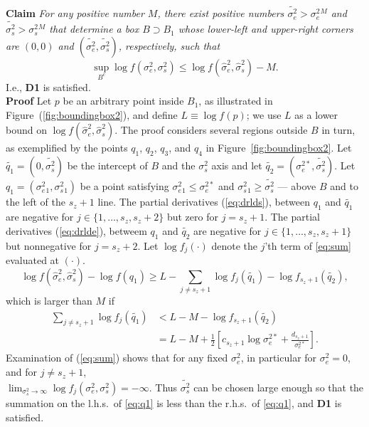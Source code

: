 \documentclass{report}
\newcommand{\RL}{f}
\newcommand{\logRL}{\log\RL}
\newcommand{\sigssq}{\sigma_s^2}
\newcommand{\sigesq}{\sigma_e^2}
\newcommand{\sshat}{\hat\sigma^2_e,\hat\sigma^2_s}
\newcommand{\logRLss}{\logRL(\sigesq,\sigssq)}
\begin{document}
\noindent\textbf{Claim} \emph{For any positive number $M$, there exist positive numbers $\widetilde{\sigma_e^2} > \sigesq{}^M$ and $\widetilde{\sigma_s^2} > \sigssq{}^M$ that determine a box $B \supset B_1$ whose lower-left and upper-right corners are $(0,0)$ and $(\widetilde{\sigma_e^2}, \widetilde{\sigma_s^2})$, respectively, such that
\begin{equation*}
  \sup_{B^c} \logRLss \le \logRL(\sshat) - M.
\end{equation*}}
I.e., \textbf{D1} is satisfied.\\
\noindent\textbf{Proof}
Let $p$ be an arbitrary point inside $B_1$, as illustrated in Figure~(\ref{fig:boundingbox2}), and define $L \equiv \logRL(p)$; we use $L$ as a lower bound on $\logRL(\sshat)$.  The proof considers several regions outside $B$ in turn, as exemplified by the points $q_1$, $q_2$, $q_3$, and $q_4$ in Figure~\ref{fig:boundingbox2}.  Let $\widetilde{q_1} = (0,\widetilde{\sigma_s^2})$ be the intercept of $B$ and the $\sigssq$ axis and let $\widetilde{q_2} = (\sigma_e^{2*},\widetilde{\sigma_s^2})$.  Let $q_1 = (\sigesq{}_1, \sigssq{}_1)$ be a point satisfying $\sigesq{}_1 \le \sigma_e^{2*}$ and $\sigssq{}_1 \ge \widetilde{\sigma_s^2}$ --- above $B$ and to the left of the $s_z+1$ line.  The partial derivatives (\ref{eq:drlds}), between $q_1$ and $\widetilde{q_1}$ are negative for $j \in \{1, \dots, s_z, s_z+2\}$ but zero for $j=s_z+1$.  The partial derivatives (\ref{eq:drlde}), betweem $q_1$ and $\widetilde{q_2}$ are negative for $j \in \{1, \dots, s_z, s_z+1\}$ but nonnegative for $j=s_z+2$.  Let $\logRL_j(\cdot)$ denote the $j$'th term of \eqref{eq:sum} evaluated at $(\cdot)$.  
\begin{equation}
	\logRL(\sshat) - \logRL(q_1) \ge L - \sum_{j \ne s_z+1} \logRL_j(\widetilde{q_1}) - \logRL_{s_z+1}(\widetilde{q_2}),
\end{equation}
which is larger than $M$ if
\begin{equation}
\label{eq:q1}
  \begin{split}
    \sum_{j \ne s_z+1} \logRL_j(\widetilde{q_1})
      &< L - M - \logRL_{s_z+1}(\widetilde{q_2})\\
      &= L - M + \frac{1}{2} \left[ c_{s_z+1}\log\sigma_e^{2*} + \frac{d_{s_z+1}}{\sigma_e^{2*}}\right].
  \end{split}
\end{equation}
Examination of (\ref{eq:sum}) shows that for any fixed $\sigesq$, in particular for $\sigesq=0$, and for $j \ne s_z+1$,\\ $\lim_{\sigssq \rightarrow \infty} \logRL_j(\sigesq,\sigssq) = -\infty$.  Thus $\widetilde{\sigma_s^2}$ can be chosen large enough so that the summation on the l.h.s.~of \eqref{eq:q1} is less than the r.h.s.~of \eqref{eq:q1}, and  \textbf{D1} is satisfied.
\end{document}
